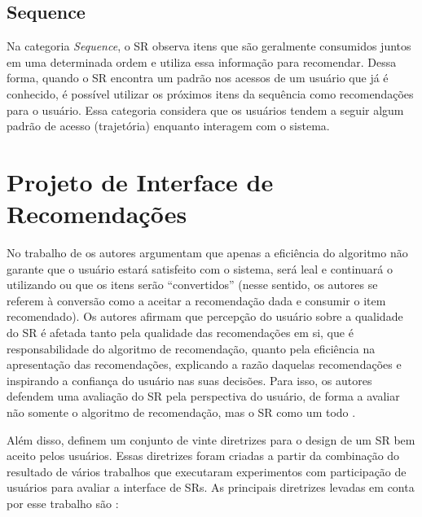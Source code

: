 \subsection{Sequence}\label{subsection:sequence}

Na categoria \textit{Sequence}, o SR observa itens que são geralmente consumidos juntos em uma determinada ordem e utiliza essa
informação para recomendar. Dessa forma, quando o SR encontra um padrão nos acessos de um usuário que já é conhecido,
é possível utilizar os próximos itens da sequência como recomendações para o usuário. Essa categoria considera que os usuários
tendem a seguir algum padrão de acesso (trajetória) enquanto interagem com o sistema.

\section{Projeto de Interface de Recomendações}\label{section:fundamentacao-apresentacao-recomendacao}

No trabalho de  os autores argumentam que apenas a eficiência do algoritmo não garante
que o usuário estará satisfeito com o sistema, será leal e continuará o utilizando ou que os itens serão ``convertidos''
(nesse sentido, os autores se referem à conversão como a aceitar a recomendação dada e consumir o item recomendado).
Os autores afirmam que percepção do usuário sobre a qualidade do SR é afetada tanto pela
qualidade das recomendações em si, que é responsabilidade do algoritmo de recomendação, quanto pela eficiência na apresentação
das recomendações, explicando a razão daquelas recomendações e inspirando a confiança do usuário nas suas decisões.
Para isso, os autores defendem uma avaliação do SR pela perspectiva do usuário, de forma a avaliar não somente o algoritmo de
recomendação, mas o SR como um todo \cite{pu2012evaluating}.

Além disso,  definem um conjunto de vinte diretrizes para o design de um SR bem aceito
pelos usuários. Essas diretrizes foram criadas a partir da combinação do resultado de vários trabalhos que executaram
experimentos com participação de usuários para avaliar a interface de SRs. As principais
diretrizes levadas em conta por esse trabalho são \cite{pu2012evaluating}:

